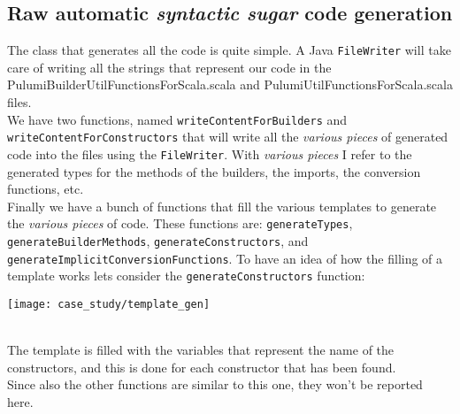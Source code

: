 \subsection{Raw automatic \textit{syntactic sugar} code generation}
The class that generates all the code is quite simple.
A Java \texttt{FileWriter} will take care of writing all the strings that represent our code in the PulumiBuilderUtilFunctionsForScala.scala and PulumiUtilFunctionsForScala.scala files.\\
We have two functions, named \texttt{writeContentForBuilders} and \texttt{writeContentForConstructors} that will write all the \textit{various pieces} of generated code into the files using the \texttt{FileWriter}.
With \textit{various pieces} I refer to the generated types for the methods of the builders, the imports, the conversion functions, etc.\\
Finally we have a bunch of functions that fill the various templates to generate the \textit{various pieces} of code.
These functions are: \texttt{generateTypes}, \texttt{generateBuilderMethods}, \texttt{generateConstructors}, and \texttt{generateImplicitConversionFunctions}.
To have an idea of how the filling of a template works lets consider the \texttt{generateConstructors} function:\\
\begin{center}
  \texttt{[image: case\_study/template\_gen]} 
\end{center}\mbox{}\\
The template is filled with the variables that represent the name of the constructors, and this is done for each constructor that has been found.\\
Since also the other functions are similar to this one, they won't be reported here.

